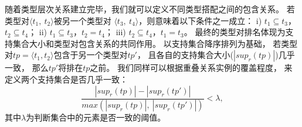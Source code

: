 随着类型层次关系建立完毕，我们就可以定义不同类型搭配之间的包含关系。
若类型对$\langle t_1,\ t_2\rangle$被另一个类型对
$\langle t_3,\ t_4\rangle$，则意味着以下条件之一成立：
i) $t_1 \subseteq t_3$，$t_2 \subseteq t_4$；
ii) $t_1 \subseteq t_3$，$t_2 = t_4$；
iii) $t_2 \subseteq t_4$，$t_1 = t_3$。
最终的类型对排名体现为支持集合大小和类型对包含关系的共同作用。
以支持集合降序排列为基础，
若类型对$tp=\langle t_1, t_2 \rangle$包含于另一个类型对$tp'$，
且各自的支持集合大小($|sup_{r}(tp)|$)几乎一致，
那么$tp'$将排在$tp$之前。
我们同样可以根据重叠关系实例的覆盖程度，
来定义两个支持集合是否几乎一致：
\begin{equation}
\frac{\left|sup_{r}(tp)\right|-\left|sup_{r}(tp')\right|} {max(\left|sup_{r}(tp)\right|,\ \left|sup_{r}(tp')\right|)} < \lambda,
\end{equation}
其中$\lambda$为判断集合中的元素是否一致的阈值。

